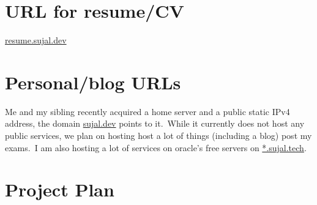 \documentclass[11pt]{article}
\begin{document}
    \section{URL for resume/CV}
    \label{sec:resume}

    \href{https://resume.sujal.dev}{resume.sujal.dev}




    \section{Personal/blog URLs}
    \label{sec:personal-urls}

    Me and my sibling recently acquired a home server and a public static IPv4 address, the domain
    \href{https://sujal.dev}{sujal.dev} points to it.\ While it currently does not host any public services, we plan
    on hosting host a lot of things (including a blog) post my exams.\ I am also hosting a lot of services on oracle's
    free servers on \href{https://sujal.tech}{*.sujal.tech}.




    \section{Project Plan}
    \label{sec:project-plan}

    


\end{document}
